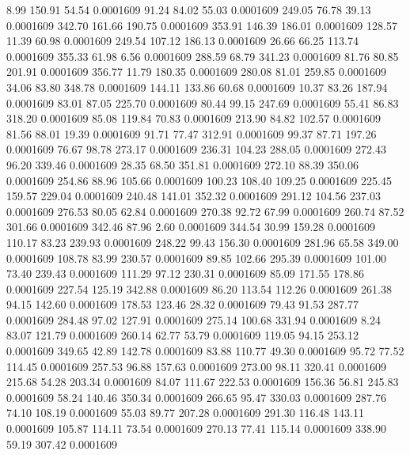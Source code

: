    8.99  150.91   54.54   0.0001609
  91.24   84.02   55.03   0.0001609
 249.05   76.78   39.13   0.0001609
 342.70  161.66  190.75   0.0001609
 353.91  146.39  186.01   0.0001609
 128.57   11.39   60.98   0.0001609
 249.54  107.12  186.13   0.0001609
  26.66   66.25  113.74   0.0001609
 355.33   61.98    6.56   0.0001609
 288.59   68.79  341.23   0.0001609
  81.76   80.85  201.91   0.0001609
 356.77   11.79  180.35   0.0001609
 280.08   81.01  259.85   0.0001609
  34.06   83.80  348.78   0.0001609
 144.11  133.86   60.68   0.0001609
  10.37   83.26  187.94   0.0001609
  83.01   87.05  225.70   0.0001609
  80.44   99.15  247.69   0.0001609
  55.41   86.83  318.20   0.0001609
  85.08  119.84   70.83   0.0001609
 213.90   84.82  102.57   0.0001609
  81.56   88.01   19.39   0.0001609
  91.71   77.47  312.91   0.0001609
  99.37   87.71  197.26   0.0001609
  76.67   98.78  273.17   0.0001609
 236.31  104.23  288.05   0.0001609
 272.43   96.20  339.46   0.0001609
  28.35   68.50  351.81   0.0001609
 272.10   88.39  350.06   0.0001609
 254.86   88.96  105.66   0.0001609
 100.23  108.40  109.25   0.0001609
 225.45  159.57  229.04   0.0001609
 240.48  141.01  352.32   0.0001609
 291.12  104.56  237.03   0.0001609
 276.53   80.05   62.84   0.0001609
 270.38   92.72   67.99   0.0001609
 260.74   87.52  301.66   0.0001609
 342.46   87.96    2.60   0.0001609
 344.54   30.99  159.28   0.0001609
 110.17   83.23  239.93   0.0001609
 248.22   99.43  156.30   0.0001609
 281.96   65.58  349.00   0.0001609
 108.78   83.99  230.57   0.0001609
  89.85  102.66  295.39   0.0001609
 101.00   73.40  239.43   0.0001609
 111.29   97.12  230.31   0.0001609
  85.09  171.55  178.86   0.0001609
 227.54  125.19  342.88   0.0001609
  86.20  113.54  112.26   0.0001609
 261.38   94.15  142.60   0.0001609
 178.53  123.46   28.32   0.0001609
  79.43   91.53  287.77   0.0001609
 284.48   97.02  127.91   0.0001609
 275.14  100.68  331.94   0.0001609
   8.24   83.07  121.79   0.0001609
 260.14   62.77   53.79   0.0001609
 119.05   94.15  253.12   0.0001609
 349.65   42.89  142.78   0.0001609
  83.88  110.77   49.30   0.0001609
  95.72   77.52  114.45   0.0001609
 257.53   96.88  157.63   0.0001609
 273.00   98.11  320.41   0.0001609
 215.68   54.28  203.34   0.0001609
  84.07  111.67  222.53   0.0001609
 156.36   56.81  245.83   0.0001609
  58.24  140.46  350.34   0.0001609
 266.65   95.47  330.03   0.0001609
 287.76   74.10  108.19   0.0001609
  55.03   89.77  207.28   0.0001609
 291.30  116.48  143.11   0.0001609
 105.87  114.11   73.54   0.0001609
 270.13   77.41  115.14   0.0001609
 338.90   59.19  307.42   0.0001609
